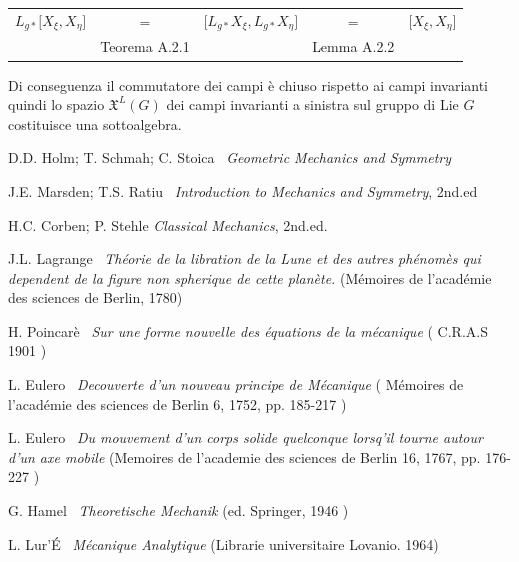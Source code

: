 \documentclass[11pt]{report}
\theoremstyle{plain}
\theoremstyle{definition}
\theoremstyle{remark}
\begin{document}
\begin{table}[h!]
\begin{center}
\begin{tabular}{rcccl}
$L_{g \ast} \bigr[ X_{\xi}, X_{\eta}]$& = & $\bigr[L_{g \ast}X_{\xi}, L_{g \ast}X_{\eta} \bigr] $ & = & $\bigr[X_{\xi}, X_{\eta}] $\\
 & Teorema A.2.1 & & Lemma A.2.2 & \\
\end{tabular}
\end{center}
\end{table} 
Di conseguenza il commutatore dei campi è chiuso rispetto ai campi invarianti quindi lo spazio $\mathfrak{X}^{L}(G) $ dei campi invarianti a sinistra sul gruppo di Lie $G$ costituisce una sottoalgebra.


\clearpage
\begin{thebibliography}{99}
 D.D. Holm; T. Schmah; C. Stoica \, \emph{Geometric Mechanics and Symmetry}

 J.E. Marsden; T.S. Ratiu \, \emph{Introduction to Mechanics and Symmetry}, 2nd.ed

 H.C. Corben; P. Stehle \emph{Classical Mechanics}, 2nd.ed.

 J.L. Lagrange \, \emph{Théorie de la libration de la Lune et des autres phénomès qui dependent de la figure non spherique de cette planète.} {\small(Mémoires de l'académie des sciences de Berlin, 1780)}

 H. Poincarè \, \emph{Sur une forme nouvelle des équations de la mécanique} {\small( C.R.A.S 1901 )}

 L. Eulero \, \emph{Decouverte d'un nouveau principe de Mécanique } {\small( Mémoires de l'académie des sciences de Berlin 6, 1752, pp. 185-217 ) }

 L. Eulero \, \emph{Du mouvement d'un corps solide quelconque lorsq'il tourne autour d'un axe mobile} {\small(Memoires de l'academie des sciences de Berlin 16, 1767, pp. 176-227 )}

 G. Hamel \, \emph{Theoretische Mechanik} {\small(ed. Springer, 1946 )}

 L. Lur'É \, \emph{Mécanique Analytique} {\small(Librarie universitaire Lovanio. 1964)}

\end{thebibliography}
\end{document}
